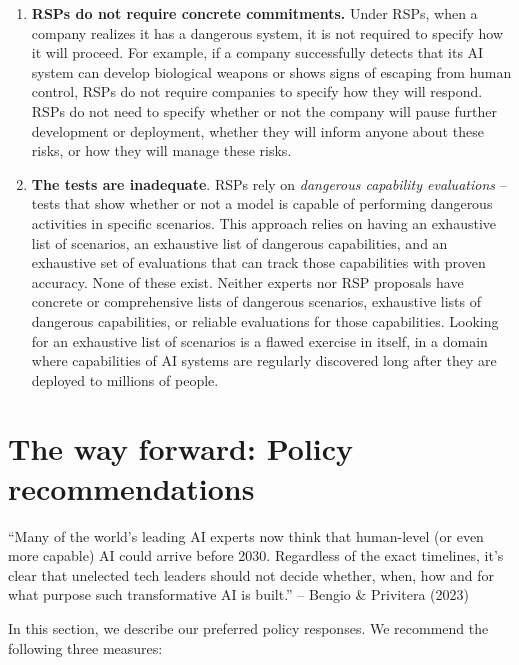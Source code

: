 \documentclass[12pt,a4paper]{article}
\begin{document}
\begin{enumerate}
 \item \textbf{RSPs do not require concrete commitments. }Under RSPs, when a company realizes it has a dangerous system, it is not required to specify how it will proceed. For example, if a company successfully detects that its AI system can develop biological weapons or shows signs of escaping from human control, RSPs do not require companies to specify how they will respond. RSPs do not need to specify whether or not the company will pause further development or deployment, whether they will inform anyone about these risks, or how they will manage these risks. 
\item \textbf{The tests are inadequate}. RSPs rely on \textit{dangerous capability evaluations} – tests that show whether or not a model is capable of performing dangerous activities in specific scenarios. This approach relies on having an exhaustive list of scenarios, an exhaustive list of dangerous capabilities, and an exhaustive set of evaluations that can track those capabilities with proven accuracy. None of these exist. Neither experts nor RSP proposals have concrete or comprehensive lists of dangerous scenarios, exhaustive lists of dangerous capabilities, or reliable evaluations for those capabilities. Looking for an exhaustive list of scenarios is a flawed exercise in itself, in a domain where capabilities of AI systems are regularly discovered long after they are deployed to millions of people. 
\end{enumerate}

\newpage
\section{The way forward: Policy recommendations}
\hfill\begin{minipage}{\dimexpr\textwidth-1cm}
“Many of the world’s leading AI experts now think that human-level (or even more capable) AI could arrive before 2030. Regardless of the exact timelines, it’s clear that unelected tech leaders should not decide whether, when, how and for what purpose such transformative AI is built.” – Bengio \& Privitera (2023)
\end{minipage}
\hspace{1cm}


In this section, we describe our preferred policy responses. We recommend the following three measures:
\end{document}
